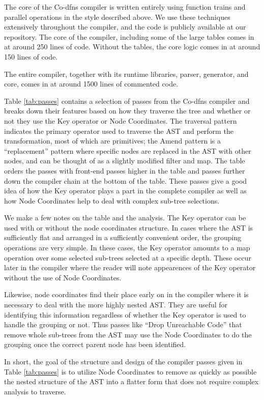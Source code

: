 \documentclass[numbers,preprint]{sigplanconf}
\begin{document}
The core of the Co-dfns compiler is written entirely using function trains 
and parallel operations in the style described above. We use these techniques 
extensively throughout the compiler, and the code is publicly available 
at our repository. The core of the compiler, including some of the large 
tables comes in at around 250 lines of code. Without the tables, the core 
logic comes in at around 150 lines of code. 

The entire compiler, together with its runtime libraries, parser, generator, 
and core, comes in at around 1500 lines of commented code. 

Table \ref{tab:passes} contains a selection of passes from the
Co-dfns compiler and breaks down their features based on how they
traverse the tree and whether or not they use the Key operator or
Node Coordinates.
The traversal pattern indicates the primary operator used to traverse the AST 
and perform the transformation, most of which are primitives; the Amend pattern 
is a ``replacement'' pattern where specific nodes are replaced in the AST with 
other nodes, and can be thought of as a slightly modified filter and map.
The table orders the passes with front-end passes higher in
the table and passes further down the compiler chain at the bottom
of the table. These passes give a good idea of how the Key operator
plays a part in the complete compiler as well as how Node Coordinates
help to deal with complex sub-tree selections.

We make a few notes on the table and the analysis. The Key operator
can be used with or without the node coordinates structure. In cases
where the AST is sufficiently flat and arranged in a sufficiently
convenient order, the grouping operations are very simple. In these
cases, the Key operator amounts to a map operation over some selected
sub-trees selected at a specific depth. These occur later in the
compiler where the reader will note appearences of the Key operator
without the use of Node Coordinates.

Likewise, node coordinates find their place early on in the compiler
where it is necessary to deal with the more highly nested AST. They
are useful for identifying this information regardless of whether the
Key operator is used to handle the grouping or not. Thus passes like
``Drop Unreachable Code'' that remove whole sub-trees from the AST
may use the Node Coordinates to do the grouping once the correct
parent node has been identified.

In short, the goal of the structure and design of the compiler passes
given in Table \ref{tab:passes} is to utilize Node Coordinates to
remove as quickly as possible the nested structure of the AST into
a flatter form that does not require complex analysis to traverse.
\end{document}
